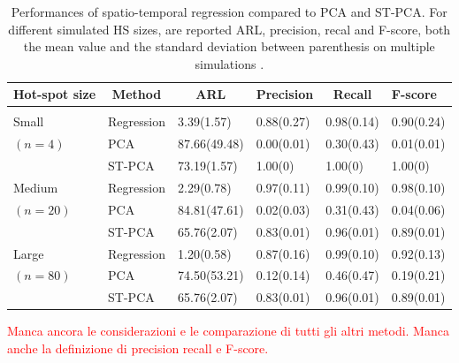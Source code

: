 \begin{table}
\small
\centering
\begin{tabular}{llllll}
\hline
\rowcolor{bluepoli!40}
Hot-spot size & \multicolumn{1}{c}{Method} & \multicolumn{1}{c}{ARL} & \multicolumn{1}{c}{Precision} & \multicolumn{1}{c}{Recall} & F-score\\
\hline \hline
\\
Small & Regression & 3.39(1.57) & 0.88(0.27) & 0.98(0.14) & 0.90(0.24) \\
$(n=4)$ & PCA & 87.66(49.48) & 0.00(0.01) & 0.30(0.43) & 0.01(0.01) \\
& ST-PCA & 73.19(1.57) & 1.00(0) & 1.00(0) & 1.00(0) \\[0.5 cm]
Medium & Regression & 2.29(0.78)& 0.97(0.11)& 0.99(0.10)& 0.98(0.10) \\
$(n=20)$& PCA& 84.81(47.61)& 0.02(0.03)& 0.31(0.43)& 0.04(0.06) \\
& ST-PCA& 65.76(2.07)& 0.83(0.01)& 0.96(0.01)& 0.89(0.01) \\[0.5 cm]
Large& Regression& 1.20(0.58)& 0.87(0.16)& 0.99(0.10)& 0.92(0.13) \\
$(n=80)$& PCA& 74.50(53.21)& 0.12(0.14)& 0.46(0.47)& 0.19(0.21) \\
& ST-PCA& 65.76(2.07)& 0.83(0.01)& 0.96(0.01)& 0.89(0.01) \\[0.5 cm]
\end{tabular}
\caption{Performances of spatio-temporal regression compared to PCA and ST-PCA. For different simulated HS sizes, are reported ARL, precision, recal and F-score, both the mean value and the standard deviation between parenthesis on multiple simulations \cite{yan_real-time_2021}.}
\label{tab:last}
\end{table}
\textcolor{red}{Manca ancora le considerazioni e le comparazione di tutti gli altri metodi. Manca anche la definizione di precision recall e F-score.}




